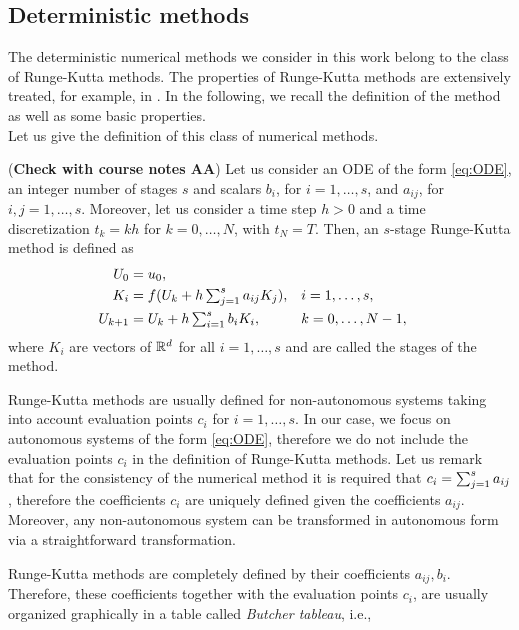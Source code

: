 \subsection{Deterministic methods}

The deterministic numerical methods we consider in this work belong to the class of Runge-Kutta methods. The properties of Runge-Kutta methods are extensively treated, for example, in \cite{HLW02, HaW96}. In the following, we recall the definition of the method as well as some basic properties. \\
Let us give the definition of this class of numerical methods.
\begin{definition}\label{def:RK} (\textbf{Check with course notes AA}) Let us consider an ODE of the form \eqref{eq:ODE}, an integer number of stages $s$ and scalars $b_i$, for $i = 1, \ldots, s$, and $a_{ij}$, for $i, j = 1, \ldots, s$. Moreover, let us consider a time step $h > 0$ and a time discretization $t_k = kh$ for $k = 0, \ldots, N$, with $t_N = T$. Then, an $s$-stage Runge-Kutta method is defined as
\begin{equation}
\begin{aligned}
	U_0 &= u_0, \\
	K_i &= f(U_k + h\textstyle\sum_{j=1}^s a_{ij}K_j), && i = 1, \ldots, s, \\
	U_{k+1} &= U_k + h \textstyle\sum_{i=1}^s b_i K_i, && k = 0, \ldots, N-1,
\end{aligned}
\end{equation}
where $K_i$ are vectors of $\mathbb{R}^d$ for all $i = 1, \ldots, s$ and are called the stages of the method.
\end{definition}
\begin{remark} Runge-Kutta methods are usually defined for non-autonomous systems taking into account evaluation points $c_i$ for $i = 1, \ldots, s$. In our case, we focus on autonomous systems of the form \eqref{eq:ODE}, therefore we do not include the evaluation points $c_i$ in the definition of Runge-Kutta methods. Let us remark that for the consistency of the numerical method it is required that $c_i = \textstyle\sum_{j=1}^s a_{ij}$, therefore the coefficients $c_i$ are uniquely defined given the coefficients $a_{ij}$. Moreover, any non-autonomous system can be transformed in autonomous form via a straightforward transformation. 
\end{remark}
\noindent Runge-Kutta methods are completely defined by their coefficients $a_{ij}, b_i$. Therefore, these coefficients together with the evaluation points $c_i$, are usually organized graphically in a table called \textit{Butcher tableau}, i.e.,

